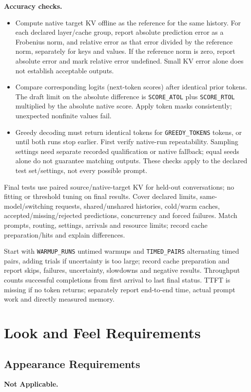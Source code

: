 \documentclass[12pt]{article}
\begin{document}
\textbf{Accuracy checks.}
\begin{itemize}
\item Compute native target KV offline as the reference for the same history.
For each declared layer/cache group, report absolute prediction error as a
Frobenius norm, and relative error as that error divided by the reference
norm, separately for keys and values. If the reference norm is zero, report
absolute error and mark relative error undefined. Small KV error alone does
not establish acceptable outputs.
\item Compare corresponding logits (next-token scores) after identical prior
tokens. The draft limit on the absolute difference is
\texttt{SCORE\_ATOL} plus \texttt{SCORE\_RTOL} multiplied by the absolute
native score. Apply token masks
consistently; unexpected nonfinite values fail.
\item Greedy decoding must return identical tokens for \texttt{GREEDY\_TOKENS} tokens,
or until both runs stop earlier. First verify native-run repeatability.
Sampling settings need separate recorded qualification or native fallback;
equal seeds alone do not guarantee matching outputs.
These checks apply to the declared test set/settings, not every possible prompt.
\end{itemize}

Final tests use paired source/native-target KV for held-out conversations;
no fitting or threshold tuning on final results. Cover declared limits,
same-model/switching requests, shared/unshared histories, cold/warm caches,
accepted/missing/rejected predictions, concurrency and forced failures.
Match prompts, routing, settings, arrivals and resource limits; record cache
preparation/hits and explain differences.

Start with \texttt{WARMUP\_RUNS} untimed warmups and \texttt{TIMED\_PAIRS}
alternating timed pairs, adding trials if uncertainty is too large;
record cache preparation and report
skips, failures, uncertainty, slowdowns and negative results. Throughput counts
successful completions from first arrival to last final status. TTFT is
missing if no token returns; separately report end-to-end time, actual prompt
work and directly measured memory.

\section{Look and Feel Requirements}


\subsection{Appearance Requirements}
\textbf{Not Applicable.}
\end{document}
